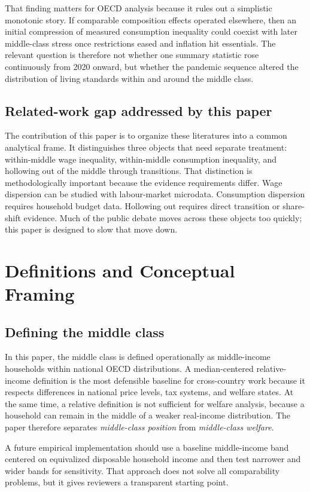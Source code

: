 \documentclass[11pt]{article}
\begin{document}
That finding matters for OECD analysis because it rules out a simplistic monotonic story. If comparable composition effects operated elsewhere, then an initial compression of measured consumption inequality could coexist with later middle-class stress once restrictions eased and inflation hit essentials. The relevant question is therefore not whether one summary statistic rose continuously from 2020 onward, but whether the pandemic sequence altered the distribution of living standards within and around the middle class.

\subsection{Related-work gap addressed by this paper}
The contribution of this paper is to organize these literatures into a common analytical frame. It distinguishes three objects that need separate treatment: within-middle wage inequality, within-middle consumption inequality, and hollowing out of the middle through transitions. That distinction is methodologically important because the evidence requirements differ. Wage dispersion can be studied with labour-market microdata. Consumption dispersion requires household budget data. Hollowing out requires direct transition or share-shift evidence. Much of the public debate moves across these objects too quickly; this paper is designed to slow that move down.

\section{Definitions and Conceptual Framing}

\subsection{Defining the middle class}
In this paper, the middle class is defined operationally as middle-income households within national OECD distributions. A median-centered relative-income definition is the most defensible baseline for cross-country work because it respects differences in national price levels, tax systems, and welfare states. At the same time, a relative definition is not sufficient for welfare analysis, because a household can remain in the middle of a weaker real-income distribution. The paper therefore separates \emph{middle-class position} from \emph{middle-class welfare}.

A future empirical implementation should use a baseline middle-income band centered on equivalized disposable household income and then test narrower and wider bands for sensitivity. That approach does not solve all comparability problems, but it gives reviewers a transparent starting point.
\end{document}
